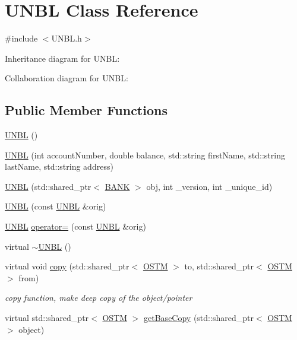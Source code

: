 \hypertarget{class_u_n_b_l}{}\section{U\+N\+BL Class Reference}
\label{class_u_n_b_l}


{\ttfamily \#include $<$U\+N\+B\+L.\+h$>$}



Inheritance diagram for U\+N\+BL\+:


Collaboration diagram for U\+N\+BL\+:
\subsection*{Public Member Functions}
\begin{DoxyCompactItemize}
\item 
\hyperlink{class_u_n_b_l_aa264ef64c453e6049b3d4c984d84d1de}{U\+N\+BL} ()
\item 
\hyperlink{class_u_n_b_l_a9afc7728e8d9970b63592af018a2afb8}{U\+N\+BL} (int account\+Number, double balance, std\+::string first\+Name, std\+::string last\+Name, std\+::string address)
\item 
\hyperlink{class_u_n_b_l_abbd578fbd58cf6f2143f17b3011f6c21}{U\+N\+BL} (std\+::shared\+\_\+ptr$<$ \hyperlink{class_b_a_n_k}{B\+A\+NK} $>$ obj, int \+\_\+version, int \+\_\+unique\+\_\+id)
\item 
\hyperlink{class_u_n_b_l_aca7a99d7308d5d8dd5841a0eeeed0852}{U\+N\+BL} (const \hyperlink{class_u_n_b_l}{U\+N\+BL} \&orig)
\item 
\hyperlink{class_u_n_b_l}{U\+N\+BL} \hyperlink{class_u_n_b_l_a32ab1105494f18bdb33e651e9bbfcd02}{operator=} (const \hyperlink{class_u_n_b_l}{U\+N\+BL} \&orig)
\item 
virtual \hyperlink{class_u_n_b_l_a32d405e6e9adfab1ffdeec6406f9e72f}{$\sim$\+U\+N\+BL} ()
\item 
virtual void \hyperlink{class_u_n_b_l_a14d5e1adc618827667d8d9524abaf31b}{copy} (std\+::shared\+\_\+ptr$<$ \hyperlink{class_o_s_t_m}{O\+S\+TM} $>$ to, std\+::shared\+\_\+ptr$<$ \hyperlink{class_o_s_t_m}{O\+S\+TM} $>$ from)
\begin{DoxyCompactList}\small\item\em copy function, make deep copy of the object/pointer \end{DoxyCompactList}\item 
virtual std\+::shared\+\_\+ptr$<$ \hyperlink{class_o_s_t_m}{O\+S\+TM} $>$ \hyperlink{class_u_n_b_l_a5dfe7f9e5fbb66abff9a73e40e803887}{get\+Base\+Copy} (std\+::shared\+\_\+ptr$<$ \hyperlink{class_o_s_t_m}{O\+S\+TM} $>$ object)

\end{DoxyCompactItemize}
